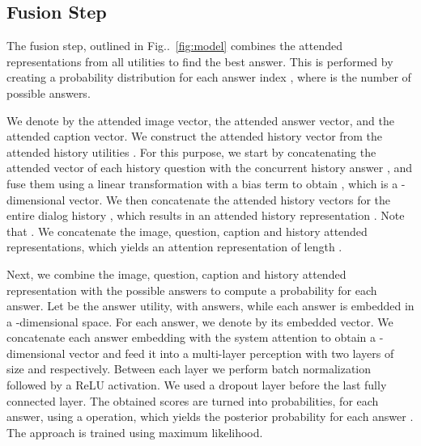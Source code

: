 \documentclass[10pt,twocolumn,letterpaper]{article}
\makeatletter
\def\@onedot{\ifx\@let@token.\else.\null\fi\xspace}
\DeclareRobustCommand\onedot{\futurelet\@let@token\@onedot}
\newcommand{\figref}[1]{Fig\onedot~\ref{#1}}
\makeatother
\begin{document}
\subsection{Fusion Step}
\label{sec:fusion}






The fusion step, outlined in \figref{fig:model} combines the attended representations  from all  utilities  to find the best answer. This is performed by creating a probability distribution  for each answer index , where  is the number of possible answers. 

We denote by  the attended image vector,  the attended answer vector, and  the attended caption vector. We construct the attended history vector  from the attended history utilities . For this purpose, we start by concatenating the attended vector of each history question  with the concurrent history answer , and fuse them using a linear transformation with a bias term to obtain , which is a -dimensional vector. We then concatenate the attended history vectors  for the entire dialog history  , which results in an attended history representation . Note that . We concatenate the image, question, caption and history  attended representations, which yields an attention representation  of length . 

Next, we combine the image, question, caption and history attended representation  with the  possible answers to compute a probability for each answer. Let  be the answer utility, with  answers, while each answer is embedded in a -dimensional space. For each answer, we denote by  
its embedded vector. We concatenate each answer embedding with the system attention  to obtain a -dimensional vector and feed it into a multi-layer perception  with two layers of size  and  respectively.  Between each layer we perform batch normalization followed by a ReLU activation. We used a dropout layer before the last fully connected layer. The obtained scores are turned into probabilities, for each answer,  using a  operation, which yields the posterior probability for each answer .
The approach is trained using maximum likelihood. 





 
\end{document}
